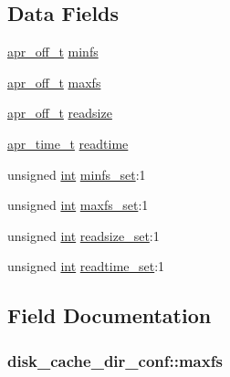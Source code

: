 \subsection*{Data Fields}
\begin{DoxyCompactItemize}
\item 
\hyperlink{group__apr__platform_ga6938af9075cec15c88299109381aa984}{apr\+\_\+off\+\_\+t} \hyperlink{structdisk__cache__dir__conf_af668f7e8f40a223a8c98b1491d0b8a2b}{minfs}
\item 
\hyperlink{group__apr__platform_ga6938af9075cec15c88299109381aa984}{apr\+\_\+off\+\_\+t} \hyperlink{structdisk__cache__dir__conf_a83b0219c8870030c63d2f624c9f31e9d}{maxfs}
\item 
\hyperlink{group__apr__platform_ga6938af9075cec15c88299109381aa984}{apr\+\_\+off\+\_\+t} \hyperlink{structdisk__cache__dir__conf_abb509b057d27638a69c4e2eb79e508ae}{readsize}
\item 
\hyperlink{group__apr__time_gadb4bde16055748190eae190c55aa02bb}{apr\+\_\+time\+\_\+t} \hyperlink{structdisk__cache__dir__conf_ac61894653954150478562046d248b9a2}{readtime}
\item 
unsigned \hyperlink{pcre_8txt_a42dfa4ff673c82d8efe7144098fbc198}{int} \hyperlink{structdisk__cache__dir__conf_a64e3bcde577ebdbb2b4024c38346e062}{minfs\+\_\+set}\+:1
\item 
unsigned \hyperlink{pcre_8txt_a42dfa4ff673c82d8efe7144098fbc198}{int} \hyperlink{structdisk__cache__dir__conf_a90d67a2ee3980b8bc316b5861ef024af}{maxfs\+\_\+set}\+:1
\item 
unsigned \hyperlink{pcre_8txt_a42dfa4ff673c82d8efe7144098fbc198}{int} \hyperlink{structdisk__cache__dir__conf_a82e2aa2a938f70d769dc9cdc8191e23d}{readsize\+\_\+set}\+:1
\item 
unsigned \hyperlink{pcre_8txt_a42dfa4ff673c82d8efe7144098fbc198}{int} \hyperlink{structdisk__cache__dir__conf_a64efbdd1014c542c8755d55193edddd6}{readtime\+\_\+set}\+:1
\end{DoxyCompactItemize}


\subsection{Field Documentation}
\subsubsection[{\texorpdfstring{maxfs}{maxfs}}]{ disk\+\_\+cache\+\_\+dir\+\_\+conf\+::maxfs}\hypertarget{structdisk__cache__dir__conf_a83b0219c8870030c63d2f624c9f31e9d}{}\label{structdisk__cache__dir__conf_a83b0219c8870030c63d2f624c9f31e9d}
